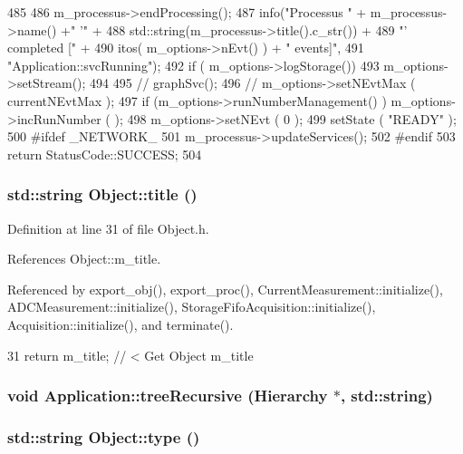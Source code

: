\begin{DoxyCode}
485                                     {
486   m_processus->endProcessing();
487   info("Processus " + m_processus->name() +" '" +
488        std::string(m_processus->title().c_str()) +
489        "' completed [" +
490        itos( m_options->nEvt() ) + " events]",
491        "Application::svcRunning");
492   if ( m_options->logStorage()) {
493     m_options->setStream();
494   }
495   //  graphSvc();
496   //  m_options->setNEvtMax ( currentNEvtMax );
497   if (m_options->runNumberManagement() ) m_options->incRunNumber ( );
498   m_options->setNEvt ( 0 );
499   setState ( "READY" );
500 #ifdef _NETWORK_
501   m_processus->updateServices();
502 #endif
503   return StatusCode::SUCCESS;
504 }
\end{DoxyCode}
\hypertarget{classObject_a73a0f1a41828fdd8303dd662446fb6c3}{
\subsubsection[{title}]{\setlength{\rightskip}{0pt plus 5cm}std::string Object::title ()}}
\label{classObject_a73a0f1a41828fdd8303dd662446fb6c3}


Definition at line 31 of file Object.h.

References Object::m\_\-title.

Referenced by export\_\-obj(), export\_\-proc(), CurrentMeasurement::initialize(), ADCMeasurement::initialize(), StorageFifoAcquisition::initialize(), Acquisition::initialize(), and terminate().


\begin{DoxyCode}
31 { return m_title;      } // < Get Object m_title
\end{DoxyCode}
\hypertarget{classApplication_ab4a53c51303b155b738970bec9a6ce89}{
\subsubsection[{treeRecursive}]{\setlength{\rightskip}{0pt plus 5cm}void Application::treeRecursive ({\bf Hierarchy} $\ast$, \/  std::string)}}
\label{classApplication_ab4a53c51303b155b738970bec9a6ce89}
\hypertarget{classObject_a84f99f70f144a83e1582d1d0f84e4e62}{
\subsubsection[{type}]{\setlength{\rightskip}{0pt plus 5cm}std::string Object::type ()}}
\label{classObject_a84f99f70f144a83e1582d1d0f84e4e62}


